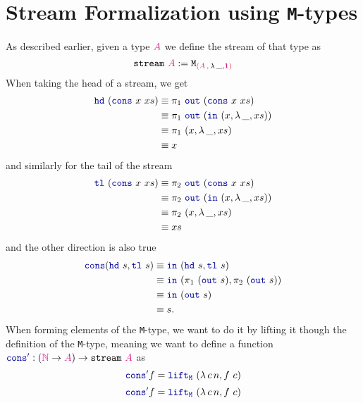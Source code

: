 \documentclass[twoside,11pt,openright]{report}
\theoremstyle{plain} %
\theoremstyle{definition}
\theoremstyle{remark}
\newcommand*{\type}[1]{\textcolor{magenta!90!black}{#1}}
\newcommand*{\containerpair}[2]{\textcolor{red}{(}#1\,\textcolor{red}{,}\,#2\textcolor{red}{)}}
\newcommand*{\unit}{\type{\textbf{1}}}
\newcommand*{\function}[1]{\textcolor{blue!60!black}{\ensuremath{\mathtt{#1}}}}
\newcommand*{\typeformer}[1]{\ensuremath{\mathtt{#1}}}
\begin{document}
\section{Stream Formalization using \texttt{M}-types}
As described earlier, given a type \(\type{A}\) we define the stream of that type as
\begin{equation}
  \typeformer{stream}~\type{A} := \typeformer{M}_{\containerpair{\type{A}}{\lambda\,\_,\unit}}
\end{equation}
When taking the head of a stream, we get
\begin{align}
  \function{hd}~(\function{cons}~x~xs) &\equiv \pi_1~\function{out}~(\function{cons}~x~xs) \\
                                       &\equiv \pi_1~\function{out}~(\function{in}~(x , \lambda\,\_,xs)) \\
                                       &\equiv \pi_1~(x , \lambda\,\_,xs) \\
                                       &\equiv x
\end{align}
and similarly for the tail of the stream
\begin{align}
  \function{tl}~(\function{cons}~x~xs) &\equiv \pi_2~\function{out}~(\function{cons}~x~xs) \\
                                       &\equiv \pi_2~\function{out}~(\function{in}~(x , \lambda\,\_,xs)) \\
                                       &\equiv \pi_2~(x , \lambda\,\_,xs) \\
                                       &\equiv xs
\end{align}
and the other direction is also true
\begin{align}
  \function{cons}(\function{hd}~s , \function{tl}~s) &\equiv \function{in}~(\function{hd}~s , \function{tl}~s) \\
                                                     &\equiv \function{in}~(\pi_1~(\function{out}~s) , \pi_2~(\function{out}~s)) \\
                                                     &\equiv \function{in}~(\function{out}~s) \\
                                                     &\equiv s.
\end{align}
When forming elements of the \texttt{M}-type, we want to do it by lifting it though the definition of the \texttt{M}-type, meaning we want to define a function \(\function{cons'} : (\type{\mathbb{N}} \rightarrow \type{A}) \rightarrow \typeformer{stream}~\type{A}\) as
\begin{equation}
  \function{cons'} f = \function{lift_M}~(\lambda\,c\,n, f~c)
\end{equation}
\begin{equation}
  \function{cons'} f = \function{lift_M}~(\lambda\,c\,n, f~c)
\end{equation}
\end{document}
